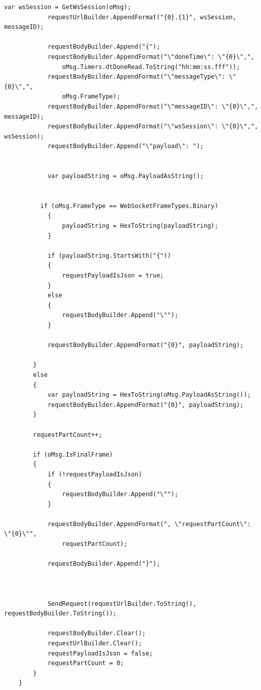 \documentclass{book}
\begin{document}
\begin{lstlisting}[language={[Sharp]C}]
            var wsSession = GetWsSession(oMsg);
            requestUrlBuilder.AppendFormat("{0}.{1}", wsSession, messageID);
               
            requestBodyBuilder.Append("{");
            requestBodyBuilder.AppendFormat("\"doneTime\": \"{0}\",", 
                oMsg.Timers.dtDoneRead.ToString("hh:mm:ss.fff"));
            requestBodyBuilder.AppendFormat("\"messageType\": \"{0}\",", 
                oMsg.FrameType);
            requestBodyBuilder.AppendFormat("\"messageID\": \"{0}\",", messageID);
            requestBodyBuilder.AppendFormat("\"wsSession\": \"{0}\",", wsSession);
            requestBodyBuilder.Append("\"payload\": ");
               
                
            var payloadString = oMsg.PayloadAsString();

            
          if (oMsg.FrameType == WebSocketFrameTypes.Binary)
            {
                payloadString = HexToString(payloadString); 
            }

            if (payloadString.StartsWith("{"))
            {
                requestPayloadIsJson = true;                   
            }
            else
            {
                requestBodyBuilder.Append("\"");
            }
               
            requestBodyBuilder.AppendFormat("{0}", payloadString);
                          
        }
        else
        {
            var payloadString = HexToString(oMsg.PayloadAsString());
            requestBodyBuilder.AppendFormat("{0}", payloadString);
        }
           
        requestPartCount++;
           
        if (oMsg.IsFinalFrame)
        {
            if (!requestPayloadIsJson)
            {
                requestBodyBuilder.Append("\"");
            }
           
            requestBodyBuilder.AppendFormat(", \"requestPartCount\": \"{0}\"", 
                requestPartCount);
               
            requestBodyBuilder.Append("}");      
            
                                
            
            SendRequest(requestUrlBuilder.ToString(), requestBodyBuilder.ToString()); 
                        
            requestBodyBuilder.Clear();
            requestUrlBuilder.Clear();
            requestPayloadIsJson = false;
            requestPartCount = 0;
        }       
    }
       

\end{lstlisting}
\end{document}
